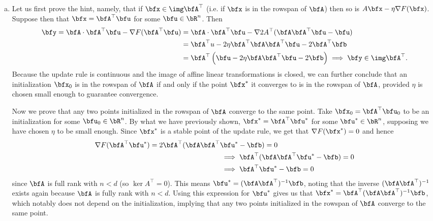 \begin{homework}[e]
\begin{prf}
\begin{enumerate}[(a)]
      \item Let us first prove the hint, namely, that if $\bfx \in \img\bfA^\top$ (i.e. if $\bfx$ is in the rowspan of $\bfA$) then so is $A\bfx - \eta \nabla F(\bfx)$. Suppose then that $\bfx = \bfA^\top \bfu$ for some $\bfu \in \bR^n$. Then
        \begin{align*}
          \bfy = \bfA \cdot \bfA^\top \bfu - \nabla F(\bfA^\top \bfu) 
            &=\bfA \cdot \bfA^\top \bfu - \nabla 2A^\top(\bfA \bfA^\top \bfu - \bfu) \\
            &= \bfA^\top u - 2\eta \bfA^\top \bfA \bfA^\top \bfu - 2\bfA^\top \bfb \\
            &= \bfA^\top\left(\bfu - 2\eta \bfA\bfA^\top \bfu - 2\bfb\right) \implies \bfy \in \img \bfA^\top.
        \end{align*}
        Because the update rule is continuous and the image of affine linear transformations is closed, we can further conclude that an initialization $\bfx_0$ is in the rowspan of $\bfA$ if and only if the point $\bfx^*$ it converges to is in the rowspan of $\bfA$, provided $\eta$ is chosen small enough to guarantee convergence.

        \bigskip

        Now we prove that any two points initialized in the rowspan of $\bfA$ converge to the same point. Take $\bfx_0 = \bfA^\top \bfu_0$ to be an initialization for some $\bfu_0 \in \bR^n$. By what we have previously shown, $\bfx^* = \bfA^\top \bfu^*$ for some $\bfu^* \in \bR^n$, supposing we have chosen $\eta$ to be small enough. Since $\bfx^*$ is a stable point of the update rule, we get that $\nabla F(\bfx^*) = 0$ and hence
        \begin{align*}
          \nabla F(\bfA^\top \bfu^*) = 2\bfA^\top(\bfA\bfA^\top &\bfu^* - \bfb) = 0 \\
            &\implies \bfA^\top(\bfA\bfA^\top \bfu^* - \bfb) = 0\\
            &\implies \bfA^\top \bfu^* - \bfb = 0
        \end{align*}
        since $\bfA$ is full rank with $n < d$ (so $\ker A^\top = 0$). This means $\bfu^* = (\bfA\bfA^\top)^{-1}\bfb$, noting that the inverse $(\bfA\bfA^\top)^{-1}$ exists again because $\bfA$ is fully rank with $n < d$. Using this expression for $\bfu^*$ gives us that $\bfx^* = \bfA^\top(\bfA\bfA^\top)^{-1}\bfb$, which notably does not depend on the initialization, implying that any two points initialized in the rowspan of $\bfA$ converge to the same point.


\end{enumerate}
\end{prf}
\end{homework}

